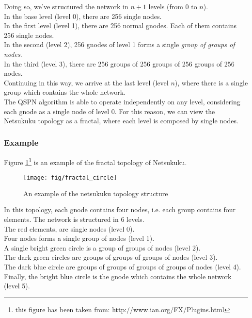\documentclass[a4paper]{article}
\newcommand{\href}[2]{ #1 }
\begin{document}
Doing so, we've structured the network in $n+1$ levels (from $0$ to $n$).\\
In the base level (level 0), there are 256 single nodes.\\
In the first level (level 1), there are 256 normal gnodes. Each of them
contains 256 single nodes.\\
In the second (level 2), 256 gnodes of level 1 forms a single \emph{group of
groups of nodes}.\\
In the third (level 3), there are 256 groups of 256 groups of 256 groups of
256 nodes.\\
Continuing in this way, we arrive at the last level (level $n$), where there
is a single group which contains the whole network.\\

The QSPN algorithm is able to operate independently on any level,
considering each gnode as a single node of level 0.
For this reason, we can view the Netsukuku topology as a fractal, where each
level is composed by single nodes.

\subsubsection*{Example}

Figure \ref{fig:fract_circle}\footnote{this figure has been taken from:
\href{http://www.ian.org/FX/Plugins.html}{http://www.ian.org/FX/Plugins.html}}
is an example of the fractal topology of Netsukuku.

\begin{figure}[h]
	\begin{center}
		\texttt{[image: fig/fractal\_circle]}
	\end{center}
	\caption{An example of the netsukuku topology structure}
	\label{fig:fract_circle}
\end{figure}

In this topology, each gnode contains four nodes, i.e. each group contains
four elements. The network is structured in 6 levels.\\
The red elements, are single nodes (level 0).\\
Four nodes forms a single group of nodes (level 1).\\
A single bright green circle is a 
				  group of groups of nodes (level 2).\\
The dark green circles are        groups of groups of groups of nodes (level 3).\\
The dark blue circle are          groups of groups of groups of groups of
nodes (level 4). \\
Finally, the bright blue circle is the gnode which contains the whole network
(level 5).
\end{document}
